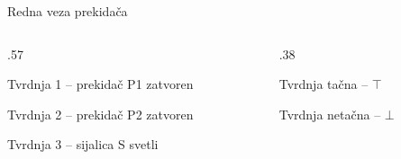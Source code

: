 \begin{frame}[label=01-s005]{Redna veza prekidača}
\begin{columns}[T,onlytextwidth]
\begin{column}{.57\textwidth}
{\centering\par}
\vspace{2mm}
{\fontsize{11}{13}\selectfont\setlength{\parskip}{0pt}
Tvrdnja 1 – prekidač P1 zatvoren\par
Tvrdnja 2 – prekidač P2 zatvoren\par
Tvrdnja 3 – sijalica S svetli\par}
\end{column}
\begin{column}{.38\textwidth}
{\centering\par}
\vspace{2mm}
{\centering\fontsize{11}{13}\selectfont\setlength{\parskip}{0pt}
Tvrdnja tačna – \(\top\)\par
Tvrdnja netačna – \(\bot\)\par}
\end{column}
\end{columns}
\vspace{2mm}
\end{frame}
